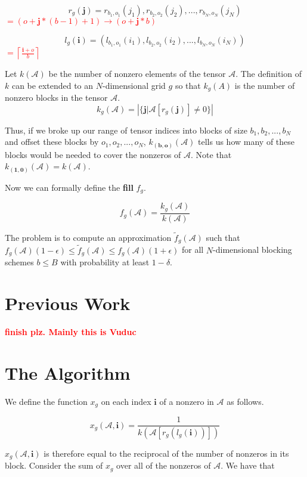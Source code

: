 \documentclass[12pt]{article}
\theoremstyle{dfn}
\numberwithin{equation}{section}
\numberwithin{figure}{section}
\newcommand{\todo}[1] {\textbf{\textcolor{red}{#1}}}
\renewcommand{\vec}[1] {\mathbf{#1}}
\newcommand{\Ten}[1] {\mathbf{\mathcal{#1}}}
\begin{document}
    \[
      r_g(\vec{j}) = r_{b_1, o_1}(j_1), r_{b_2, o_2}(j_2), ..., r_{b_N, o_N}(j_N)
    \]\todo{$ = (o + \vec{j} * (b - 1) + 1) \to (o + \vec{j} * b)$}

    \[
      l_g(\vec{i}) = (l_{b_1, o_1}(i_1), l_{b_2, o_2}(i_2), ..., l_{b_N, o_N}(i_N))
    \]\todo{$ = \left\lceil\frac{\vec{i} + o}{b}\right\rceil$}

    Let $k(\Ten{A})$ be the number of nonzero elements of the tensor $\Ten{A}$. The definition of $k$ can be extended to an $N$-dimensional grid $g$ so that $k_g(A)$ is the number of nonzero blocks in the tensor $\Ten{A}$.
    \[
      k_g(\Ten{A}) = \left|\{\vec{j} | \Ten{A}[r_g(\vec{j})] \neq 0\}\right|
    \]

    Thus, if we broke up our range of tensor indices into blocks of size $b_1, b_2, ..., b_N$ and offset these blocks by $o_1, o_2, ..., o_N$, $k_{(\vec{b}, \vec{o})}(\Ten{A})$ tells us how many of these blocks would be needed to cover the nonzeros of $\Ten{A}$. Note that $k_{(\vec{1}, \vec{0})}(\Ten{A}) = k(\Ten{A})$.

    Now we can formally define the \textbf{fill} $f_g$.

    \[
      f_g(\Ten{A}) = \frac{k_g(\Ten{A})}{k(\Ten{A})}
    \]

    The problem is to compute an approximation $\tilde{f}_g(\Ten{A})$ such that $f_g(\Ten{A})(1 - \epsilon) \leq \tilde{f}_g(\Ten{A}) \leq f_g(\Ten{A})(1 + \epsilon)$ for all $N$-dimensional blocking schemes $b \leq B$ with probability at least $1 - \delta$.
  \section{Previous Work}
    \todo{finish plz. Mainly this is Vuduc}

  \section{The Algorithm}

    We define the function $x_g$ on each index $\vec{i}$ of a nonzero in $\Ten{A}$ as follows.

    \[
      x_g(\Ten{A}, \vec{i}) = \frac{1}{k(\Ten{A}[r_g(l_g(\vec{i}))])}
    \]

    $x_g(\Ten{A}, \vec{i})$ is therefore equal to the reciprocal of the number of nonzeros in its block. Consider the sum of $x_g$ over all of the nonzeros of $\Ten{A}$. We have that
\end{document}
